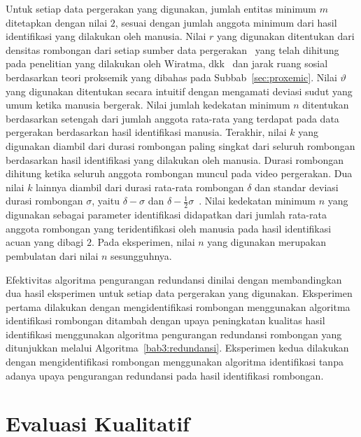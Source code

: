 Untuk setiap data pergerakan yang digunakan, jumlah entitas minimum $m$ ditetapkan dengan nilai $2$, sesuai dengan jumlah anggota minimum dari hasil identifikasi yang dilakukan oleh manusia. Nilai $r$ yang digunakan ditentukan dari densitas rombongan dari setiap sumber data pergerakan~\cite{solera:06:range-reference} yang telah dihitung pada penelitian yang dilakukan oleh Wiratma, dkk~\cite{wiratma:software} dan jarak ruang sosial berdasarkan teori proksemik yang dibahas pada Subbab~\ref{sec:proxemic}. Nilai $\vartheta$ yang digunakan ditentukan secara intuitif dengan mengamati deviasi sudut yang umum ketika manusia bergerak. Nilai jumlah kedekatan minimum $n$ ditentukan berdasarkan setengah dari jumlah anggota rata-rata yang terdapat pada data pergerakan berdasarkan hasil identifikasi manusia. Terakhir, nilai $k$ yang digunakan diambil dari durasi rombongan paling singkat dari seluruh rombongan berdasarkan hasil identifikasi yang dilakukan oleh manusia. Durasi rombongan dihitung ketika seluruh anggota rombongan muncul pada video pergerakan. Dua nilai $k$ lainnya diambil dari durasi rata-rata rombongan $\delta$ dan standar deviasi durasi rombongan $\sigma$, yaitu $\delta - \sigma$ dan $\delta - \frac{1}{2}\sigma$~\cite{wiratma:software}. Nilai kedekatan minimum $n$ yang digunakan sebagai parameter identifikasi didapatkan dari jumlah rata-rata anggota rombongan yang teridentifikasi oleh manusia pada hasil identifikasi acuan yang dibagi $2$. Pada eksperimen, nilai $n$ yang digunakan merupakan pembulatan dari nilai $n$ sesungguhnya. 

Efektivitas algoritma pengurangan redundansi dinilai dengan membandingkan dua hasil eksperimen untuk setiap data pergerakan yang digunakan. Eksperimen pertama dilakukan dengan mengidentifikasi rombongan menggunakan algoritma identifikasi rombongan ditambah dengan upaya peningkatan kualitas hasil identifikasi menggunakan algoritma pengurangan redundansi rombongan yang ditunjukkan melalui Algoritma~\ref{bab3:redundansi}. Eksperimen kedua dilakukan dengan mengidentifikasi rombongan menggunakan algoritma identifikasi tanpa adanya upaya pengurangan redundansi pada hasil identifikasi rombongan.

\section{Evaluasi Kualitatif}
\label{sec:qualitative}

